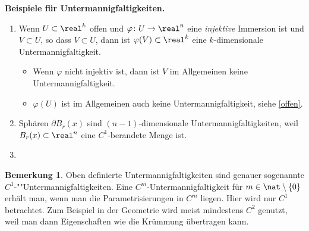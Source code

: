 \documentclass[
 a4paper,
 12pt,
 parskip=half
 ]{scrartcl}
\theoremstyle{plain}
\theoremstyle{definition}
\newtheorem*{rmrk}{Bemerkung}
\numberwithin{equation}{section}
\begin{document}
\textbf{Beispiele für Untermannigfaltigkeiten.}
\begin{enumerate}
 \item Wenn $U \subset \real^k$ offen und $\varphi\colon U \to \real^n$ eine \emph{injektive} Immersion ist und $V \subset U$, so dass $\overline V \subset U$, dann ist $\varphi(V) \subset \real^k$ eine $k$-dimensionale Untermannigfaltigkeit.
 \begin{itemize}
  \item Wenn $\varphi$ nicht injektiv ist, dann ist $V$ im Allgemeinen keine Untermannigfaltigkeit.
  \item $\varphi(U)$ ist im Allgemeinen auch keine Untermannigfaltigkeit, siehe \ref{offen}.
 \end{itemize}
 \item Sphären $\partial B_r(x)$ sind $(n-1)$-dimensionale Untermannigfaltigkeiten, weil $B_r(x) \subset \real^n$ eine $C^1$-berandete Menge ist.
 \item 
\end{enumerate}

\begin{rmrk}
 Oben definierte Untermannigfaltigkeiten sind genauer sogenannte $C^1$-""Untermannigfaltigkeiten. Eine $C^m$-Untermannigfaltigkeit für $m \in \nat \setminus \{0\}$ erhält man, wenn man die Parametrisierungen in $C^m$ liegen. Hier wird nur $C^1$ betrachtet. Zum Beispiel in der Geometrie wird meist mindestens $C^2$ genutzt, weil man dann Eigenschaften wie die Krümmung übertragen kann.
\end{rmrk}

\newpage
\end{document}
